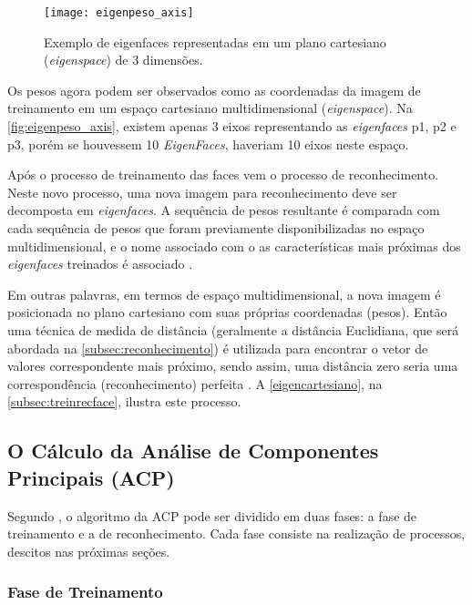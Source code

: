 \begin{figure}[h]
	\centering
	\texttt{[image: eigenpeso\_axis]}
	\caption{Exemplo de eigenfaces representadas em um plano cartesiano (\textit{eigenspace}) de 3 dimensões. }
	\label{fig:eigenpeso_axis}
\end{figure}

Os pesos agora podem ser observados como as coordenadas da imagem de treinamento em um espaço cartesiano multidimensional (\textit{eigenspace}). Na \autoref{fig:eigenpeso_axis}, existem apenas 3 eixos representando as \textit{eigenfaces} p1, p2 e p3, porém se houvessem 10 \textit{EigenFaces}, haveriam 10 eixos neste espaço.

Após o processo de treinamento das faces vem o processo de reconhecimento. Neste novo processo, uma nova imagem para reconhecimento deve ser decomposta em \textit{eigenfaces}. A sequência de pesos resultante é comparada com cada sequência de pesos que foram previamente disponibilizadas no espaço multidimensional, e o nome associado com o as características mais próximas dos \textit{eigenfaces} treinados é associado \cite{drmathew_java_programming}.

Em outras palavras, em termos de espaço multidimensional, a nova imagem é posicionada no plano cartesiano com suas próprias coordenadas (pesos). Então uma técnica de medida de distância (geralmente a distância Euclidiana, que será abordada na \autoref{subsec:reconhecimento}) é utilizada para encontrar o vetor de valores correspondente mais próximo, sendo assim, uma distância zero seria uma correspondência (reconhecimento) perfeita \cite{drmathew_java_programming}. A \autoref{eigencartesiano}, na \autoref{subsec:treinrecface}, ilustra este processo.



\subsection{O Cálculo da Análise de Componentes Principais (ACP)}\label{subsec:acp}

Segundo , o algoritmo da ACP pode ser dividido em duas fases: a fase de treinamento e a de reconhecimento. Cada fase consiste na realização de processos, descitos nas próximas seções.

\subsubsection{Fase de Treinamento} \label{subsec:treinamento}

